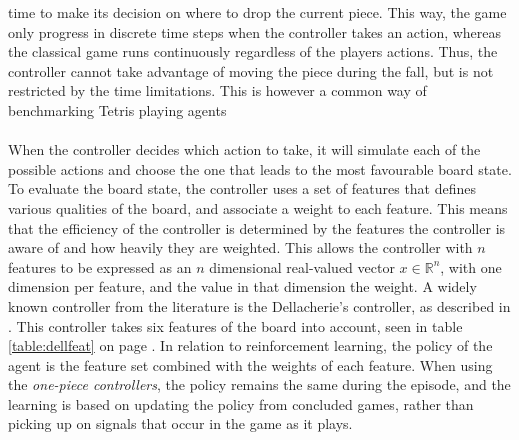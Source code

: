 time to make its decision on where to drop the current piece.
This way, the game only progress in discrete time steps
when the controller takes
an action, whereas the classical game runs continuously 
regardless of the players actions.
Thus, the controller cannot take advantage of moving the piece 
during the fall, but is not restricted by the time limitations.
This is however a common way of benchmarking Tetris playing agents
\citep{scherrer2009}\\
\\
When the controller decides which action to take, it will
simulate each of the possible actions and choose the one that
leads to the most favourable board state. To evaluate the board 
state, the controller uses a set of features that defines 
various qualities of the board, and associate a weight to each 
feature. This means that the efficiency of the controller 
is determined by the features the controller is aware of
and how heavily they are weighted. This allows
the controller with $n$ features to be expressed as an 
$n$ dimensional real-valued vector $x \in \mathbb{R}^n$, with one dimension 
per feature, and the value in that dimension the weight.
A widely known controller from the literature is the Dellacherie's controller, 
as described in \cite{scherrer2009}. This controller
takes six features of the board into account, seen in table 
\ref{table:dellfeat} on page \pageref{table:dellfeat}. In relation 
to reinforcement learning, the policy of the agent is the feature set
combined with the weights of each feature. 
When using the \textit{one-piece controllers}, the policy remains 
the same during the episode, and the learning is based on updating
the policy from concluded games, rather than picking up on signals
that occur in the game as it plays.





